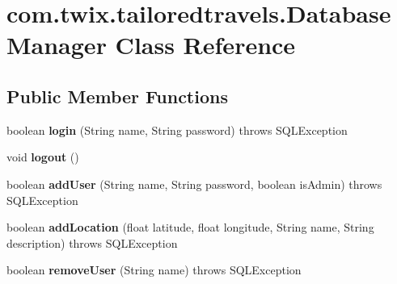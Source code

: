 \hypertarget{classcom_1_1twix_1_1tailoredtravels_1_1_database_manager}{\section{com.\-twix.\-tailoredtravels.\-Database\-Manager Class Reference}
\label{classcom_1_1twix_1_1tailoredtravels_1_1_database_manager}
}
\subsection*{Public Member Functions}
\begin{DoxyCompactItemize}
\item 
\hypertarget{classcom_1_1twix_1_1tailoredtravels_1_1_database_manager_a7ad514c70febbb99b14d8a4dab1b24a6}{boolean {\bfseries login} (String name, String password)  throws S\-Q\-L\-Exception }\label{classcom_1_1twix_1_1tailoredtravels_1_1_database_manager_a7ad514c70febbb99b14d8a4dab1b24a6}

\item 
\hypertarget{classcom_1_1twix_1_1tailoredtravels_1_1_database_manager_a3fe7ef841c1340941920745cc00a39ab}{void {\bfseries logout} ()}\label{classcom_1_1twix_1_1tailoredtravels_1_1_database_manager_a3fe7ef841c1340941920745cc00a39ab}

\item 
\hypertarget{classcom_1_1twix_1_1tailoredtravels_1_1_database_manager_ab60c1da42acf1d6ecc8955aa58da3803}{boolean {\bfseries add\-User} (String name, String password, boolean is\-Admin)  throws S\-Q\-L\-Exception }\label{classcom_1_1twix_1_1tailoredtravels_1_1_database_manager_ab60c1da42acf1d6ecc8955aa58da3803}

\item 
\hypertarget{classcom_1_1twix_1_1tailoredtravels_1_1_database_manager_a19c56c261a486a909936cf7c97334360}{boolean {\bfseries add\-Location} (float latitude, float longitude, String name, String description)  throws S\-Q\-L\-Exception }\label{classcom_1_1twix_1_1tailoredtravels_1_1_database_manager_a19c56c261a486a909936cf7c97334360}

\item 
\hypertarget{classcom_1_1twix_1_1tailoredtravels_1_1_database_manager_a73d155c07d2ed41e8c596323184da135}{boolean {\bfseries remove\-User} (String name)  throws S\-Q\-L\-Exception }\label{classcom_1_1twix_1_1tailoredtravels_1_1_database_manager_a73d155c07d2ed41e8c596323184da135}


\end{DoxyCompactItemize}
